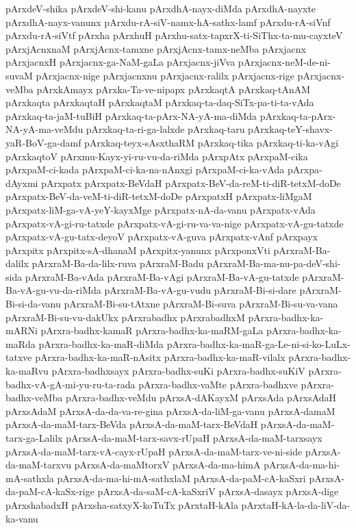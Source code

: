 {pArxdeV-shika
pArxdeV-shi-kanu
pArxdhA-nayx-diMda
pArxdhA-nayxte
pArxdhA-nayx-vanunx
pArxdu-rA-siV-namx-hA-sathx-lamf
pArxdu-rA-siVnf
pArxdu-rA-siVtf
pArxha
pArxhuH
pArxhu-satx-tapxrX-ti-SiThx-ta-mu-cayxteV
pArxjAcnxnaM
pArxjAcnx-tamxne
pArxjAcnx-tamx-neMba
pArxjacnx
pArxjacnxH
pArxjacnx-ga-NaM-gaLa
pArxjacnx-jiVva
pArxjacnx-neM-de-ni-suvaM
pArxjacnx-nige
pArxjacnxnu
pArxjacnx-ralilx
pArxjacnx-rige
pArxjacnx-veMba
pArxkAmayx
pArxka-Ta-ve-nipapx
pArxkaqtA
pArxkaq-tAnAM
pArxkaqta
pArxkaqtaH
pArxkaqtaM
pArxkaq-ta-daq-SiTx-pa-ti-ta-vAda
pArxkaq-ta-jaM-tuBiH
pArxkaq-ta-pArx-NA-yA-ma-diMda
pArxkaq-ta-pArx-NA-yA-ma-veMdu
pArxkaq-ta-ri-ga-lalxde
pArxkaq-taru
pArxkaq-teY-shavx-yaR-BoV-ga-damf
pArxkaq-teyx-sAsxthaRM
pArxkaq-tika
pArxkaq-ti-ka-vAgi
pArxkaqtoV
pArxmu-Kayx-yi-ru-vu-da-riMda
pArxpAtx
pArxpaM-cika
pArxpaM-ci-kada
pArxpaM-ci-ka-na-nAnxgi
pArxpaM-ci-ka-vAda
pArxpa-dAyxmi
pArxpatx
pArxpatx-BeVdaH
pArxpatx-BeV-da-reM-ti-diR-tetxM-doDe
pArxpatx-BeV-da-veM-ti-diR-tetxM-doDe
pArxpatxH
pArxpatx-liMgaM
pArxpatx-liM-ga-vA-yeY-kayxMge
pArxpatx-nA-da-vanu
pArxpatx-vAda
pArxpatx-vA-gi-ru-tatxde
pArxpatx-vA-gi-ru-va-va-nige
pArxpatx-vA-gu-tatxde
pArxpatx-vA-gu-tatx-deyoV
pArxpatx-vA-guva
pArxpatx-vAnf
pArxpayx
pArxpitx
pArxpitx-sA-dhanaM
pArxpitx-yanunx
pArxponxVti
pArxraM-Ba-dalilx
pArxraM-Ba-da-lilx-ruva
pArxraM-Badu
pArxraM-Ba-ma-nu-pa-deV-shi-sida
pArxraM-Ba-vAda
pArxraM-Ba-vAgi
pArxraM-Ba-vA-gu-tatxde
pArxraM-Ba-vA-gu-vu-da-riMda
pArxraM-Ba-vA-gu-vudu
pArxraM-Bi-si-dare
pArxraM-Bi-si-da-vanu
pArxraM-Bi-su-tAtxne
pArxraM-Bi-suva
pArxraM-Bi-su-va-vana
pArxraM-Bi-su-vu-dakUkx
pArxrabadhx
pArxrabadhxM
pArxra-badhx-ka-mARNi
pArxra-badhx-kamaR
pArxra-badhx-ka-maRM-gaLa
pArxra-badhx-ka-maRda
pArxra-badhx-ka-maR-diMda
pArxra-badhx-ka-maR-ga-Le-ni-si-ko-LuLx-tatxve
pArxra-badhx-ka-maR-nAsitx
pArxra-badhx-ka-maR-vilalx
pArxra-badhx-ka-maRvu
pArxra-badhxsayx
pArxra-badhx-suKi
pArxra-badhx-suKiV
pArxra-badhx-vA-gA-mi-yu-ru-ta-rada
pArxra-badhx-vaMte
pArxra-badhxve
pArxra-badhx-veMba
pArxra-badhx-veMdu
pArxsA-dAKayxM
pArxsAda
pArxsAdaH
pArxsAdaM
pArxsA-da-da-va-re-gina
pArxsA-da-liM-ga-vanu
pArxsA-damaM
pArxsA-da-maM-tarx-BeVda
pArxsA-da-maM-tarx-BeVdaH
pArxsA-da-maM-tarx-ga-Lalilx
pArxsA-da-maM-tarx-savx-rUpaH
pArxsA-da-maM-tarxsayx
pArxsA-da-maM-tarx-vA-cayx-rUpaH
pArxsA-da-maM-tarx-ve-ni-side
pArxsA-da-maM-tarxvu
pArxsA-da-maMtorxV
pArxsA-da-ma-himA
pArxsA-da-ma-hi-mA-sathxla
pArxsA-da-ma-hi-mA-sathxlaM
pArxsA-da-paM-cA-kaSxri
pArxsA-da-paM-cA-kaSx-rige
pArxsA-da-saM-cA-kaSxriV
pArxsA-dasayx
pArxsA-dige
pArxshabadxH
pArxsha-satxyX-koTuTx
pArxtaH-kAla
pArxtaH-kA-la-da-liV-da-ka-vanu
}
